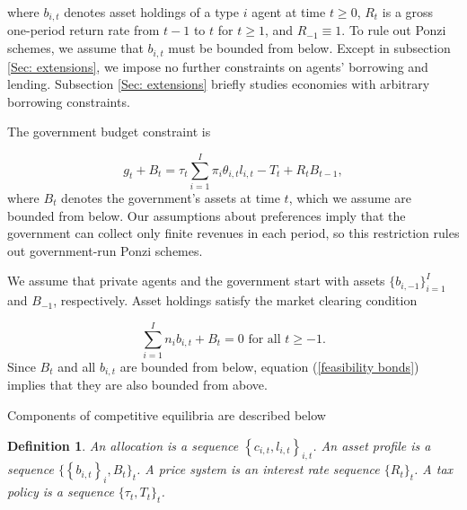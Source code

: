 \documentclass[11.5pt,twoside]{article}
\newtheorem{definition}{Definition}
\begin{document}
\noindent where $b_{i,t}$ denotes asset holdings of a type $i$ agent  at time $t\geq 0$, $%
R_{t}$ is a gross one-period return rate from  $t-1$ to
 $t$ for $t\geq 1$, and $R_{-1}\equiv 1$. To rule out Ponzi schemes,
we assume that $b_{i,t}$ must be bounded from below. Except in subsection \ref{Sec: extensions}, we
impose no further constraints on agents'  borrowing  and lending. Subsection \ref{Sec: extensions} briefly studies economies with
arbitrary borrowing constraints.

The government budget constraint is%

\begin{equation}
g_{t}+B_{t}=\tau _{t}\sum_{i=1}^{I}\pi _{i}\theta
_{i,t}l_{i,t}-T_{t}+R_{t}B_{t-1},  \label{govmt bc affine}
\end{equation}%
where $B_{t}$ denotes the government's assets at time $t$, which we assume
are bounded from below. Our assumptions about preferences
imply that the government can collect only finite revenues in each period, so
this restriction rules out government-run Ponzi schemes.

We assume that private agents and the government start with  assets $%
\{b_{i,-1}\}_{i=1}^{I}$ and $B_{-1}$, respectively.  Asset holdings
satisfy the market clearing condition%

\begin{equation}
\sum_{i=1}^{I}n _{i}b_{i,t}+B_{t}=0\text{ for all }t\geq -1.
\label{feasibility bonds}
\end{equation}%
Since $B_{t}$ and all $b_{i,t}$ are bounded from below,  equation (\ref{feasibility bonds}) implies that they are also bounded from above.


Components of  competitive  equilibria are described below

\begin{definition}
\label{Def:components} An \emph{allocation} is a sequence $\left \{
c_{i,t},l_{i,t}\right \} _{i,t}$. An \emph{asset profile} is a sequence $\{
\left \{ b_{i,t}\right \} _{i},B_{t}\}_{t}$. A \emph{price system} is an
interest rate sequence $\{R_{t}\}_{t}$. A \emph{tax policy} is a sequence $%
\{ \tau _{t},T_{t}\}_{t}$.
\end{definition}
%
\end{document}
